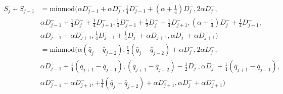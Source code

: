 \documentclass[10pt]{article}
\begin{document}
\begin{align}
S_j + S_{j-1} & = \text{minmod}\bigg(\alpha D^-_{j-1} + \alpha D^-_j , \frac{1}{4}D^-_{j-1} +  \left(\alpha + \frac{1}{4} \right) D^-_j  , 2 \alpha D^-_j , \\
& \alpha D^-_{j-1} + \frac{1}{4} D^-_{j} + \frac{1}{4}D^-_{j+1}, \frac{1}{4}D^-_{j-1} + \frac{1}{2} D^-_{j} + \frac{1}{4}D^-_{j+1}   , \left(\alpha + \frac{1}{4} \right)D^-_{j} + \frac{1}{4}D^-_{j+1},  \\
& \alpha D^-_{j-1} + \alpha D^-_{j+1}, \frac{1}{4} D^-_{j-1} + \frac{1}{4}D^-_{j} +  \alpha D^-_{j+1},\alpha D^-_{j} +  \alpha D^-_{j+1} \bigg) \\
 & = \text{minmod}\bigg(\alpha  \left(\bar{q}_{j} - \bar{q}_{j-2} \right) , \frac{1}{4} \left(\bar{q}_{j} - \bar{q}_{j-2} \right) +  \alpha D^-_j  , 2 \alpha D^-_j , \\
& \alpha D^-_{j-1} + \frac{1}{4} \left(\bar{q}_{j+1} - \bar{q}_{j-1} \right),\left(\bar{q}_{j+1} - \bar{q}_{j-2} \right) - \frac{1}{2} D^-_{j}  , \alpha D^-_{j} + \frac{1}{4}\left(\bar{q}_{j+1} - \bar{q}_{j-1} \right),  \\
& \alpha D^-_{j-1} + \alpha D^-_{j+1}, + \frac{1}{4}\left(\bar{q}_{j} - \bar{q}_{j-2} \right) +  \alpha D^-_{j+1},\alpha D^-_{j} +  \alpha D^-_{j+1} \bigg)
\end{align}
\end{document}
